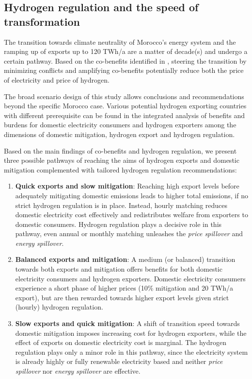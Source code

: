 \subsection*{Hydrogen regulation and the speed of transformation}
\label{subsec:timepath}
The transition towards climate neutrality of Morocco's energy system and the ramping up of exports up to 120 TWh/a are a matter of decade(s) and undergo a certain pathway. Based on the co-benefits identified in , steering the transition by minimizing conflicts and amplifying co-benefits potentially reduce both the price of electricity and price of hydrogen. 

The broad scenario design of this study allows conclusions and recommendations beyond the specific Morocco case.
Various potential hydrogen exporting countries with different prerequisite can be found in the integrated analysis of benefits and burdens for domestic electricity consumers and hydrogen exporters among the dimensions of domestic mitigation, hydrogen export and hydrogen regulation.

Based on the main findings of co-benefits and hydrogen regulation, we present three possible pathways of reaching the aims of hydrogen exports and domestic mitigation complemented with tailored hydrogen regulation recommendations:
\begin{enumerate}
    \item \textbf{Quick exports and slow mitigation}: Reaching high export levels before adequately mitigating domestic emissions leads to higher total emissions, if no strict hydrogen regulation is in place. Instead, hourly matching reduces domestic electricity cost effectively and redistributes welfare from exporters to domestic consumers. Hydrogen regulation plays a decisive role in this pathway, even annual or monthly matching unleashes the \textit{price spillover} and \textit{energy spillover}. 
    \item \textbf{Balanced exports and mitigation}: A medium (or balanced) transition towards both exports and mitigation offers benefits for both domestic electricity consumers and hydrogen exporters. Domestic electricity consumers experience a short phase of higher prices (10\% mitigation and 20 TWh/a export), but are then rewarded towards higher export levels given strict (hourly) hydrogen regulation.
    \item \textbf{Slow exports and quick mitigation}: A shift of transition speed towards domestic mitigation imposes increasing cost for hydrogen exporters, while the effect of exports on domestic electricity cost is marginal. The hydrogen regulation plays only a minor role in this pathway, since the electricity system is already highly or fully renewable electricity based and neither \textit{price spillover} nor \textit{energy spillover} are effective.
\end{enumerate}

